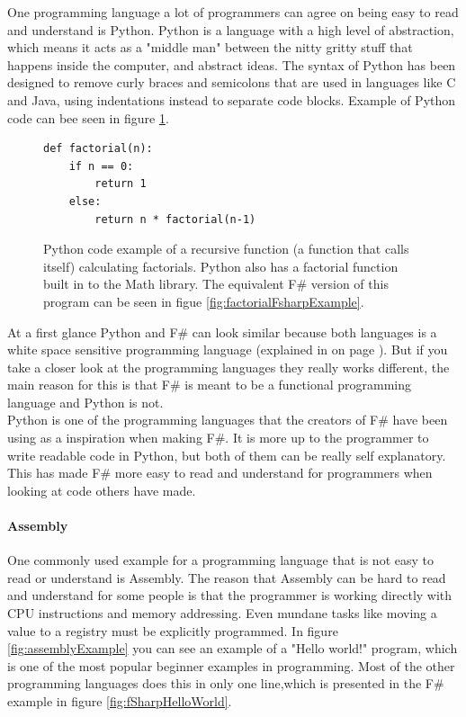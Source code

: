 \documentclass[12pt, a4paper]{article}
\begin{document}
One programming language a lot of programmers can agree on being easy to read and understand is Python. Python is a language with a high level of abstraction, which means it acts as a "middle man" between the nitty gritty stuff that happens inside the computer, and abstract ideas. The syntax of Python has been designed to remove curly braces and semicolons that are used in languages like C and Java, using indentations instead to separate code blocks. Example of Python code can bee seen in figure \ref{fig:pythonFactorial}.\\

\begin{figure}[!h]
	\begin{lstlisting}
def factorial(n):
    if n == 0:
        return 1
    else:
        return n * factorial(n-1)
	\end{lstlisting}
	\caption{Python code example of a recursive function (a function that calls itself) calculating factorials. Python also has a factorial function built in to the Math library. The equivalent F\# version of this program can be seen in figue \ref{fig:factorialFsharpExample}.}
	\label{fig:pythonFactorial}
\end{figure}

At a first glance Python and F\# can look similar because both languages is a white space sensitive programming language (explained in  on page \pageref{indentationAndCodeStructure}). But if you take a closer look at the programming languages they really works different, the main reason for this is that F\# is meant to be a functional programming language and Python is not.\\

Python is one of the programming languages that the creators of F\# have been using as a inspiration when making F\#. It is more up to the programmer to write readable code in Python, but both of them can be really self explanatory. This has made F\# more easy to read and understand for programmers when looking at code others have made.

\newpage
\paragraph{Assembly} One commonly used example for a programming language that is not easy to read or understand is Assembly. The reason that Assembly can be hard to read and understand for some people is that the programmer is working directly with CPU instructions and memory addressing. Even mundane tasks like moving a value to a registry must be explicitly programmed. In figure \ref{fig:assemblyExample} you can see an example of a "Hello world!" program, which is one of the most popular beginner examples in programming. Most of the other programming languages does this in only one line,which is presented in the F\# example in figure \ref{fig:fSharpHelloWorld}.\\
\end{document}
